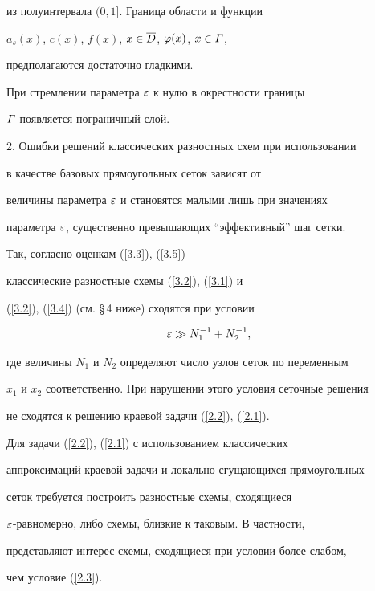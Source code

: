 из полуинтервала $(0,1]$. Граница области и функции


$a_s(x)$, $c(x)$, $f(x)$, $x\in \overline{D}$, $\varphi(x)$, $x\in \varGamma$,


предполагаются достаточно гладкими.


При стремлении параметра $\varepsilon$ к нулю в окрестности границы


$\varGamma$ появляется пограничный слой.





2. Ошибки решений классических разностных схем при использовании


в качестве базовых прямоугольных сеток зависят от


величины параметра $\varepsilon$ и становятся малыми лишь при значениях


параметра $\varepsilon$, существенно превышающих ``эффективный'' шаг сетки.


Так, согласно оценкам (\ref{3.3}), (\ref{3.5})


классические разностные схемы (\ref{3.2}), (\ref{3.1}) и


(\ref{3.2}), (\ref{3.4}) (см. \S\,4 ниже) сходятся при условии


\begin{equation} \label{2.3}


\eps\gg N_1^{-1}+N_2^{-1},


\end{equation}


где величины $N_1$ и $N_2$ определяют число узлов сеток по переменным


$x_1$ и $x_2$ соответственно. При нарушении этого условия сеточные решения


не сходятся к решению краевой задачи (\ref{2.2}), (\ref{2.1}).





Для задачи (\ref{2.2}), (\ref{2.1}) с использованием классических


аппроксимаций краевой задачи и локально сгущающихся прямоугольных


сеток требуется построить разностные схемы, сходящиеся


$\varepsilon$-равномерно, либо схемы, близкие к таковым. В частности,


представляют интерес схемы, сходящиеся при условии более слабом,


чем условие (\ref{2.3}).





